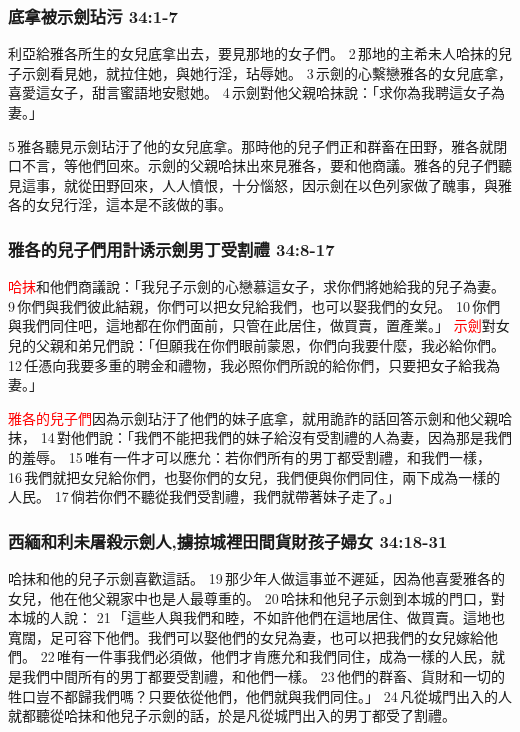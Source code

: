 \subsubsection{底拿被示劍玷污 34:1-7}
利亞給雅各所生的女兒底拿出去，要見那地的女子們。 2 那地的主希未人哈抹的兒子示劍看見她，就拉住她，與她行淫，玷辱她。 3 示劍的心繫戀雅各的女兒底拿，喜愛這女子，甜言蜜語地安慰她。 4 示劍對他父親哈抹說：「求你為我聘這女子為妻。」

 5 雅各聽見示劍玷汙了他的女兒底拿。那時他的兒子們正和群畜在田野，雅各就閉口不言，等他們回來。示劍的父親哈抹出來見雅各，要和他商議。雅各的兒子們聽見這事，就從田野回來，人人憤恨，十分惱怒，因示劍在以色列家做了醜事，與雅各的女兒行淫，這本是不該做的事。

\subsubsection{雅各的兒子們用計诱示劍男丁受割禮 34:8-17}
\textcolor{red}{哈抹}和他們商議說：「我兒子示劍的心戀慕這女子，求你們將她給我的兒子為妻。 9 你們與我們彼此結親，你們可以把女兒給我們，也可以娶我們的女兒。 10 你們與我們同住吧，這地都在你們面前，只管在此居住，做買賣，置產業。」 \textcolor{red}{示劍}對女兒的父親和弟兄們說：「但願我在你們眼前蒙恩，你們向我要什麼，我必給你們。 12 任憑向我要多重的聘金和禮物，我必照你們所說的給你們，只要把女子給我為妻。」 

\textcolor{red}{雅各的兒子們}因為示劍玷汙了他們的妹子底拿，就用詭詐的話回答示劍和他父親哈抹， 14 對他們說：「我們不能把我們的妹子給沒有受割禮的人為妻，因為那是我們的羞辱。 15 唯有一件才可以應允：若你們所有的男丁都受割禮，和我們一樣， 16 我們就把女兒給你們，也娶你們的女兒，我們便與你們同住，兩下成為一樣的人民。 17 倘若你們不聽從我們受割禮，我們就帶著妹子走了。」


\subsubsection{西緬和利未屠殺示劍人,擄掠城裡田間貨財孩子婦女 34:18-31}
哈抹和他的兒子示劍喜歡這話。 19 那少年人做這事並不遲延，因為他喜愛雅各的女兒，他在他父親家中也是人最尊重的。 20 哈抹和他兒子示劍到本城的門口，對本城的人說： 21 「這些人與我們和睦，不如許他們在這地居住、做買賣。這地也寬闊，足可容下他們。我們可以娶他們的女兒為妻，也可以把我們的女兒嫁給他們。 22 唯有一件事我們必須做，他們才肯應允和我們同住，成為一樣的人民，就是我們中間所有的男丁都要受割禮，和他們一樣。 23 他們的群畜、貨財和一切的牲口豈不都歸我們嗎？只要依從他們，他們就與我們同住。」 24 凡從城門出入的人就都聽從哈抹和他兒子示劍的話，於是凡從城門出入的男丁都受了割禮。
 

